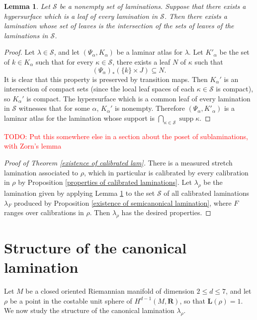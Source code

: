 \documentclass[reqno,11pt]{amsart}
\newcommand{\RR}{\mathbf{R}}
\DeclareMathOperator{\supp}{supp}
\newcommand{\Comass}{\mathbf L}
\newtheorem{lemma}[theorem]{Lemma}
\theoremstyle{definition}
\numberwithin{equation}{section}
\newcommand\todo[1]{\textcolor{red}{TODO: #1}}
\begin{document}
\begin{lemma}\label{existence of intersections}
Let $\mathscr S$ be a nonempty set of laminations.
Suppose that there exists a hypersurface which is a leaf of every lamination in $\mathscr S$.
Then there exists a lamination whose set of leaves is the intersection of the sets of leaves of the laminations in $\mathscr S$.
\end{lemma}
\begin{proof}
Let $\lambda \in \mathscr S$, and let $(\Psi_\alpha, K_\alpha)$ be a laminar atlas for $\lambda$.
Let $K'_\alpha$ be the set of $k \in K_\alpha$ such that for every $\kappa \in \mathscr S$, there exists a leaf $N$ of $\kappa$ such that
$$(\Psi_\alpha)_*(\{k\} \times J) \subseteq N.$$
It is clear that this property is preserved by transition maps.
Then $K_\alpha'$ is an intersection of compact sets (since the local leaf spaces of each $\kappa \in \mathscr S$ is compact), so $K_\alpha'$ is compact.
The hypersurface which is a common leaf of every lamination in $\mathscr S$ witnesses that for some $\alpha$, $K_\alpha'$ is nonempty.
Therefore $(\Psi_\alpha, K'_\alpha)$ is a laminar atlas for the lamination whose support is $\bigcap_{\kappa \in \mathscr S} \supp \kappa$.
\end{proof}

\todo{Put this somewhere else in a section about the poset of sublaminations, with Zorn's lemma}

\begin{proof}[Proof of Theorem \ref{existence of calibrated lam}]
There is a measured stretch lamination associated to $\rho$, which in particular is calibrated by every calibration in $\rho$ by Proposition \ref{properties of calibrated laminations}.
Let $\lambda_\rho$ be the lamination given by applying Lemma \ref{existence of intersections} to the set $\mathscr S$ of all calibrated laminations $\lambda_F$ produced by Proposition \ref{existence of semicanonical lamination}, where $F$ ranges over calibrations in $\rho$.
Then $\lambda_\rho$ has the desired properties.
\end{proof}


\section{Structure of the canonical lamination}\label{canonical structure}
Let $M$ be a closed oriented Riemannian manifold of dimension $2 \leq d \leq 7$, and let $\rho$ be a point in the costable unit sphere of $H^{d - 1}(M, \RR)$, so that $\Comass(\rho) = 1$.
We now study the structure of the canonical lamination $\lambda_\rho$.
\end{document}
